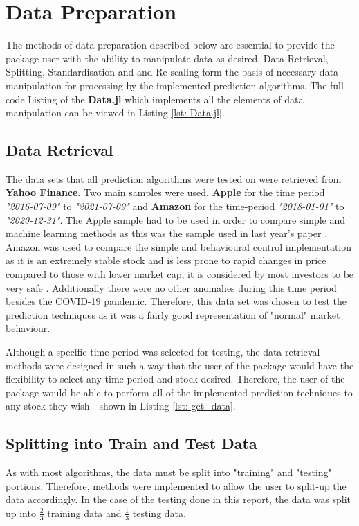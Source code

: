 \section{Data Preparation}
\label{section: data_prep}

\noindent The methods of data preparation described below are essential to provide the package user with the ability to manipulate data as desired. Data Retrieval, Splitting, Standardisation and and Re-scaling form the basis of necessary data manipulation for processing by the implemented prediction algorithms. The full code Listing of the \textbf{Data.jl} which implements all the elements of data manipulation can be viewed in Listing \ref{lst: Data.jl}.

\subsection{Data Retrieval} 
\label{imp: data_ret}
The data sets that all prediction algorithms were tested on were retrieved from \textbf{Yahoo Finance}. Two main samples were used, \textbf{Apple} for the time period \textit{"2016-07-09"} to \textit {"2021-07-09"} and  \textbf{Amazon} for the time-period \textit{"2018-01-01"} to \textit{"2020-12-31"}.
The Apple sample had to be used in order to compare simple and machine learning methods as this was the sample used in last year's paper \cite{ml_paper}. Amazon was used to compare the simple and behavioural control implementation as it is an extremely stable stock and is less prone to rapid changes in price compared to those with lower market cap, it is considered by most investors to be very safe \cite{amazon}.  Additionally there were no other anomalies during this time period besides the COVID-19 pandemic. Therefore, this data set was chosen to test the prediction techniques as it was a fairly good representation of "normal" market behaviour. 

\noindent Although a specific time-period was selected for testing, the data retrieval methods were designed in such a way that the user of the package would have the flexibility to select any time-period and stock desired. Therefore, the user of the package would be able to perform all of the implemented prediction techniques to any stock they wish - shown in Listing \ref{lst: get_data}. 

\subsection{Splitting into Train and Test Data}
\noindent As with most algorithms, the data must be split into "training" and "testing" portions. Therefore, methods were implemented to allow the user to split-up the data accordingly. In the case of the testing done in this report, the data was split up into $\frac{2}{3}$ training data and $\frac{1}{3}$ testing data.

